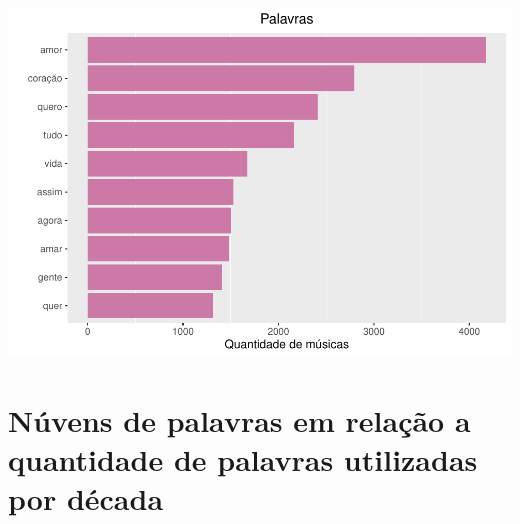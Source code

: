 \documentclass[]{article}
\begin{document}
\includegraphics{avaliacaoLetrasDeForro_files/figure-latex/unnamed-chunk-5-7.pdf}

\hypertarget{nuvens-de-palavras-em-relacao-a-quantidade-de-palavras-utilizadas-por-decada}{%
\section{Núvens de palavras em relação a quantidade de palavras
utilizadas por
década}\label{nuvens-de-palavras-em-relacao-a-quantidade-de-palavras-utilizadas-por-decada}}
\end{document}
